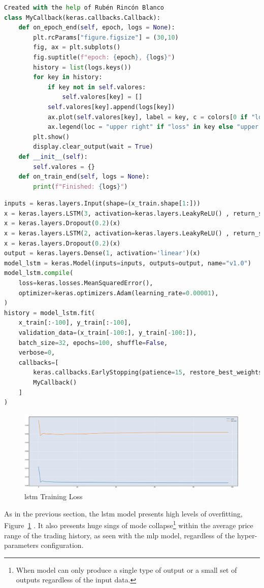 \begin{lstlisting}[language=python,caption=Custom Keras Callback,label={lst:callback}]
Created with the help of Rubén Rincón Blanco
class MyCallback(keras.callbacks.Callback):
    def on_epoch_end(self, epoch, logs = None):
        plt.rcParams["figure.figsize"] = (30,10)
        fig, ax = plt.subplots()
        fig.suptitle(f"epoch: {epoch}, {logs}")
        history = list(logs.keys())
        for key in history:
            if key not in self.valores:
                self.valores[key] = []
            self.valores[key].append(logs[key])
            ax.plot(self.valores[key], label = key, c = colors[0 if "loss" in key else 1], linestyle='--' if 'val' in key else '-')
            ax.legend(loc = "upper right" if "loss" in key else "upper left")
        plt.show()
        display.clear_output(wait = True)
    def __init__(self):
        self.valores = {}
    def on_train_end(self, logs = None):
        print(f"Finished: {logs}")
\end{lstlisting}

\begin{lstlisting}[language=python,caption=\gls{lstm} Assembly,label={lst:lstm-assembly}]
inputs = keras.layers.Input(shape=(x_train.shape[1:]))
x = keras.layers.LSTM(3, activation=keras.layers.LeakyReLU() , return_sequences=True)(inputs)
x = keras.layers.Dropout(0.2)(x)
x = keras.layers.LSTM(2, activation=keras.layers.LeakyReLU() , return_sequences=False)(x)
x = keras.layers.Dropout(0.2)(x)
output = keras.layers.Dense(1, activation='linear')(x)
model_lstm = keras.Model(inputs=inputs, outputs=output, name="v1.0")
model_lstm.compile(
    loss=keras.losses.MeanSquaredError(),
    optimizer=keras.optimizers.Adam(learning_rate=0.00001),
)
history = model_lstm.fit(
    x_train[:-100], y_train[:-100],
    validation_data=(x_train[-100:], y_train[-100:]), 
    batch_size=32, epochs=100, shuffle=False,
    verbose=0,
    callbacks=[
        keras.callbacks.EarlyStopping(patience=15, restore_best_weights=True),
        MyCallback()
    ]
)
\end{lstlisting}

\begin{figure}
    \centering
    \includegraphics[width=\textwidth]{figures/loss-lstm.png}
    \caption{\gls{lstm} Training Loss}
    \label{fig:loss-lstm}
\end{figure}

As in the previous section, the \gls{lstm} model presents high levels of overfitting, Figure~\ref{fig:loss-lstm} . It also presents huge sings of mode collapse\footnote{When model can only produce a single type of output or a small set of outputs regardless of the input data.} within the average price range of the trading history, as seen with the \gls{mlp} model, regardless of the hyper-parameters configuration. 


